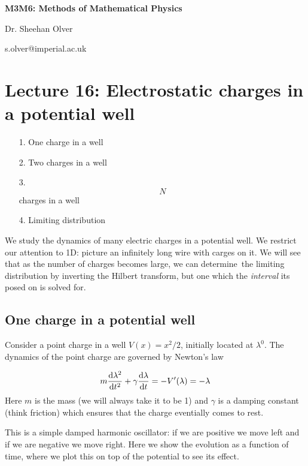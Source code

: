 \documentclass[12pt,a4paper]{article}
\def\D{ {\rm d} }
\def\dt{\D t}
\begin{document}
\textbf{M3M6: Methods of Mathematical Physics}

Dr. Sheehan Olver

s.olver@imperial.ac.uk

\section{Lecture 16: Electrostatic charges in a potential well}
\begin{itemize}
\item[1. ] One charge in a well


\item[2. ] Two charges in a well


\item[3. ] \[
N
\]
charges in a well


\item[4. ] Limiting distribution

\end{itemize}
We study the dynamics of many electric charges in a potential well.  We restrict our attention to 1D:  picture an infinitely long wire with carges on it. We will see that as the number of charges becomes large,  we can determine the limiting distribution by inverting the Hilbert transform, but one which the \emph{interval}  its posed on is solved for.

\subsection{One charge in a potential well}
Consider a point charge in a well $V(x) = x^2 / 2$, initially located at $\lambda^0$.  The dynamics of the point charge are governed by Newton's law

\[
m { \D \lambda^2 \over \dt^2} + \gamma { \D \lambda \over \dt}  = -V'(\lambda) = -  \lambda
\]
Here $m$ is the mass (we will always take it to be 1) and $\gamma$ is a damping constant (think friction) which ensures that the charge eventially comes to  rest. 

This is a simple damped harmonic oscillator: if we are positive we move left and if we are negative we move right.  Here we show the evolution as a function of time, where we plot this on top of the potential to see its effect.
\end{document}
